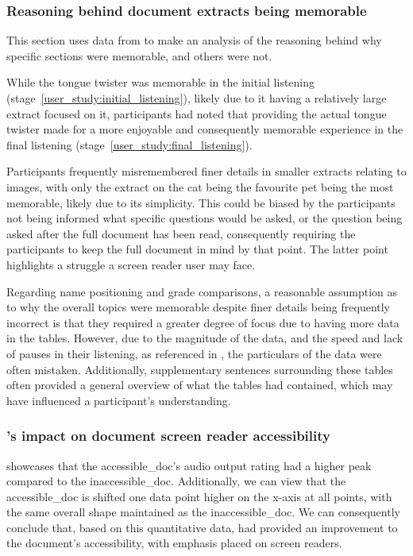 \subsubsection{Reasoning behind document extracts being memorable}
This section uses data from  to make an analysis of the reasoning behind why specific sections were memorable, and others were not. 

While the tongue twister was memorable in the initial listening (stage~\ref{user_study:initial_listening}), likely due to it having a relatively large extract focused on it, participants had noted that providing the actual tongue twister made for a more enjoyable and consequently memorable experience in the final listening (stage~\ref{user_study:final_listening}). 

Participants frequently misremembered finer details in smaller extracts relating to images, with only the extract on the cat being the favourite pet being the most memorable, likely due to its simplicity. This could be biased by the participants not being informed what specific questions would be asked, or the question being asked after the full document has been read, consequently requiring the participants to keep the full document in mind by that point. The latter point highlights a struggle a screen reader user may face.

Regarding name positioning and grade comparisons, a reasonable assumption as to why the overall topics were memorable despite finer details being frequently incorrect is that they required a greater degree of focus due to having more data in the tables. However, due to the magnitude of the data, and the speed and lack of pauses in their listening, as referenced in , the particulars of the data were often mistaken. Additionally, supplementary sentences surrounding these tables often provided a general overview of what the tables had contained, which may have influenced a participant's understanding.

\subsubsection{\lintex's impact on document screen reader accessibility}
 showcases that the \gls{accessible_doc}'s audio output rating had a higher peak compared to the \gls{inaccessible_doc}. Additionally, we can view that the \gls{accessible_doc} is shifted one data point higher on the x-axis at all points, with the same overall shape maintained as the \gls{inaccessible_doc}. We can consequently conclude that, based on this quantitative data, \lintexspaced had provided an improvement to the document's accessibility, with emphasis placed on screen readers.

